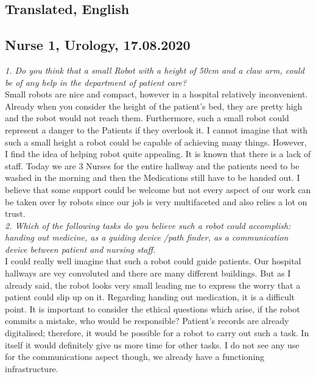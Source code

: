 \documentclass[plainarticle,zihtitle,english,final,hyperref,utf8]{zihpub}
\begin{document}
\begin{appendices}
\section{Translated, English}
\label{engInterview}
\subsection{Nurse 1, Urology, 17.08.2020}
\textit{1. Do you think that a small Robot with a height of 50cm and a claw arm, could be of any help in the department of patient care?}\\
\newline
Small robots are nice and compact, however in a hospital relatively inconvenient. Already when you consider the height of the patient's bed, they are pretty high and the robot would not reach them. Furthermore, such a small robot could represent a danger to the Patients if they overlook it. I cannot imagine that with such a small height a robot could be capable of achieving many things. However, I find the idea of helping robot quite appealing. It is known that there is a lack of staff. Today we are 3 Nurses for the entire hallway and the patients need to be washed in the morning and then the Medications still have to be handed out. I believe that some support could be welcome but not every aspect of our work can be taken over by robots since our job is very multifaceted and also relies a lot on trust.\\
\newline
\textit{2. Which of the following tasks do you believe such a robot could accomplish: handing out medicine, as a guiding device /path finder, as a communication device between patient and nursing staff.}\\
\newline
I could really well imagine that such a robot could guide patients. Our hospital hallways are vey convoluted and there are many different buildings. But as I already said, the robot looks very small leading me to express the worry that a patient could slip up on it. Regarding handing out medication, it is a difficult point. It is important to consider the ethical questions which arise, if the robot commits a mistake, who would be responsible?
Patient's records are already digitalised; therefore, it would be possible for a robot to carry out such a task. In itself it would definitely give us more time for other tasks. I do not see any use for the communications aspect though, we already have a functioning infrastructure.\\


\end{appendices}
\end{document}
